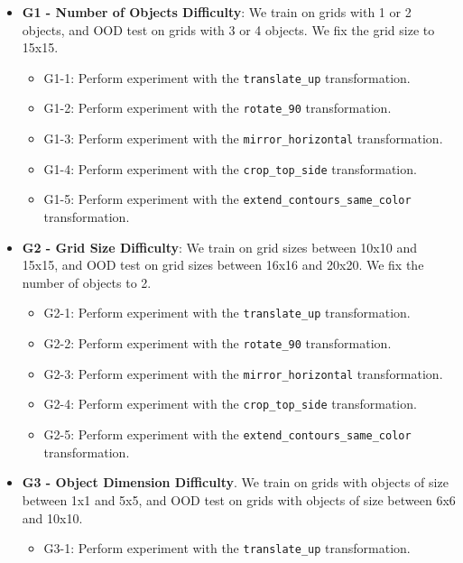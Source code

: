 \begin{itemize}
\begin{itemize}
    \item \textbf{G1 - Number of Objects Difficulty}: We train on grids with 1 or 2 objects, and OOD test on grids with 3 or 4 objects. We fix the grid size to 15x15. 
        \begin{itemize}
            \item G1-1: Perform experiment with the \texttt{translate\_up} transformation.
            \item G1-2: Perform experiment with the \texttt{rotate\_90} transformation.
            \item G1-3: Perform experiment with the \texttt{mirror\_horizontal} transformation.
            \item G1-4: Perform experiment with the \texttt{crop\_top\_side} transformation.
            \item G1-5: Perform experiment with the \texttt{extend\_contours\_same\_color} transformation.
        \end{itemize}
    \vspace{1em}
    \item \textbf{G2 - Grid Size Difficulty}: We train on grid sizes between 10x10 and 15x15, and OOD test on grid sizes between 16x16 and 20x20. We fix the number of objects to 2. 
        \begin{itemize}
            \item G2-1: Perform experiment with the \texttt{translate\_up} transformation.
            \item G2-2: Perform experiment with the \texttt{rotate\_90} transformation.
            \item G2-3: Perform experiment with the \texttt{mirror\_horizontal} transformation.
            \item G2-4: Perform experiment with the \texttt{crop\_top\_side} transformation.
            \item G2-5: Perform experiment with the \texttt{extend\_contours\_same\_color} transformation.
        \end{itemize}
    \vspace{1em}
    \item \textbf{G3 - Object Dimension Difficulty}. We train on grids with objects of size between 1x1 and 5x5, and OOD test on grids with objects of size between 6x6 and 10x10. 
    \begin{itemize}
            \item G3-1: Perform experiment with the \texttt{translate\_up} transformation.

\end{itemize}
\end{itemize}
\end{itemize}
